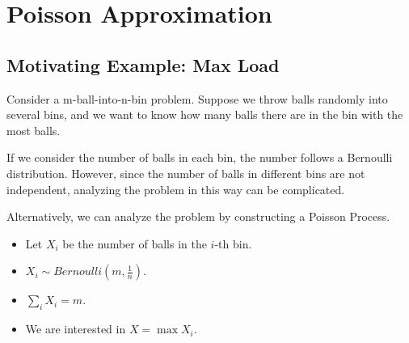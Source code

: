 \section{Poisson Approximation}
    \subsection{Motivating Example: Max Load}\label{subsec:m-balls-in-n-bins}
        Consider a m-ball-into-n-bin problem. Suppose we throw balls randomly into several bins, and we want to know how many balls there are in the bin with the most balls.

        If we consider the number of balls in each bin, the number follows a Bernoulli distribution. However, since the number of balls in different bins are not independent, analyzing the problem in this way can be complicated.

        Alternatively, we can analyze the problem by constructing a Poisson Process.

        \begin{itemize}
            \item Let $X_i$ be the number of balls in the $i$-th bin.
            \item $X_i \sim Bernoulli(m, \frac{1}{n})$.
            \item $\sum_i X_i = m$.
            \item We are interested in $X = \max X_i$.
        \end{itemize}

